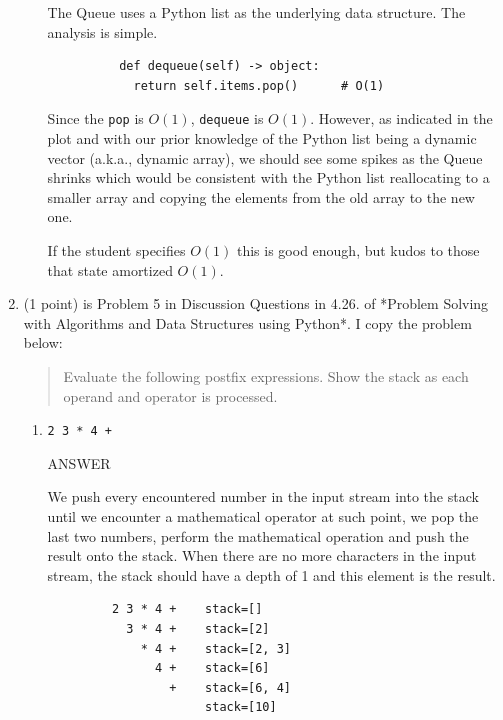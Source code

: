 \documentclass{article} %
\newenvironment{mpage}
  {\hspace{0.1in}
   \begin{minipage}{4.5in}
     \setlength{\parskip}{.5em}
     \vspace{0.1in}}    
  {\vspace{0.1in}
   \end{minipage}}
\begin{document}
\begin{enumerate}
\begin{enumerate}
\begin{mpage}
        The Queue uses a Python list as the underlying data structure.
        The analysis is simple.

        \begin{verbatim}
          def dequeue(self) -> object:
            return self.items.pop()      # O(1)
        \end{verbatim}

        Since the \verb|pop| is $O(1)$, \verb|dequeue| is $O(1)$.
        However, as indicated in the plot and with our prior knowledge
        of the Python list being a dynamic vector (a.k.a., dynamic
        array), we should see some spikes as the Queue shrinks which
        would be consistent with the Python list reallocating to a
        smaller array and copying the elements from the old array to
        the new one.

        If the student specifies $O(1)$ this is good enough, but kudos
        to those that state amortized $O(1)$.
        
      \end{mpage}
    \end{enumerate}


  \item (1 point) is Problem 5 in Discussion Questions in 4.26.  of
    *Problem Solving with Algorithms and Data Structures using
    Python*.  I copy the problem below:

    \begin{quotation}
    Evaluate the following postfix expressions. Show the stack as each
    operand and operator is processed.
    \end{quotation}

    \begin{enumerate}
    \item
      \verb|2 3 * 4 +|
      
      \begin{mpage}
        ANSWER
        
        \vspace{0.1in} We push every encountered
        number in the input stream into the stack until we encounter
        a mathematical operator at such point, we pop the last two numbers,
        perform the mathematical operation and push the result onto the
        stack.  When there are no more characters in the input stream,
        the stack should have a depth of 1 and this element is the result.

\begin{verbatim}
         2 3 * 4 +    stack=[]
           3 * 4 +    stack=[2]
             * 4 +    stack=[2, 3]
               4 +    stack=[6]
                 +    stack=[6, 4]
                      stack=[10]
\end{verbatim}
    

\end{mpage}
\end{enumerate}
\end{enumerate}
\end{document}
